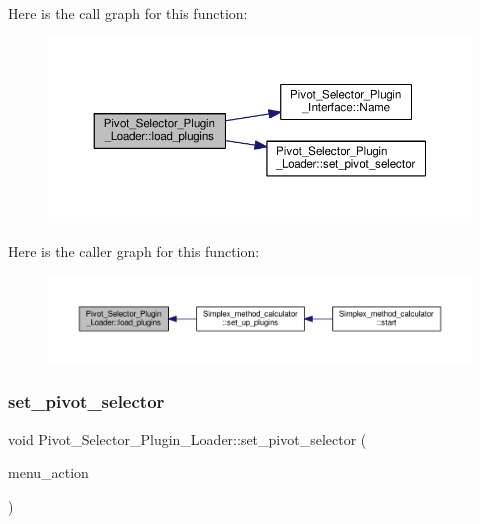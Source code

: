 Here is the call graph for this function\+:\nopagebreak
\begin{figure}[H]
\begin{center}
\leavevmode
\includegraphics[width=350pt]{classPivot__Selector__Plugin__Loader_ad29a07fed537d3aa5f6a64c10dc3c3c5_cgraph}
\end{center}
\end{figure}
Here is the caller graph for this function\+:\nopagebreak
\begin{figure}[H]
\begin{center}
\leavevmode
\includegraphics[width=350pt]{classPivot__Selector__Plugin__Loader_ad29a07fed537d3aa5f6a64c10dc3c3c5_icgraph}
\end{center}
\end{figure}
\mbox{\label{classPivot__Selector__Plugin__Loader_afe4c592a460c1219be70cbde7e36155b}} 
\subsubsection{\texorpdfstring{set\+\_\+pivot\+\_\+selector}{set\_pivot\_selector}}
{\footnotesize\ttfamily void Pivot\+\_\+\+Selector\+\_\+\+Plugin\+\_\+\+Loader\+::set\+\_\+pivot\+\_\+selector (\begin{DoxyParamCaption}\item[{Q\+Action $\ast$}]{menu\+\_\+action }\end{DoxyParamCaption})\hspace{0.3cm}{\ttfamily [slot]}}



